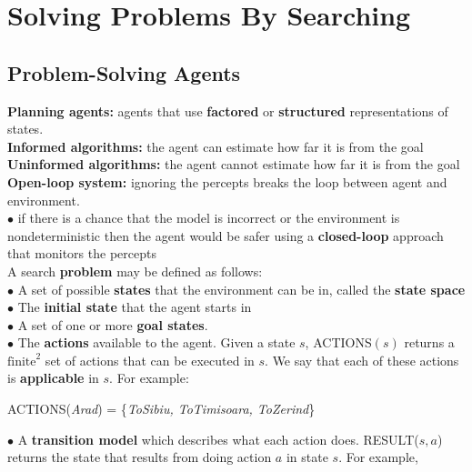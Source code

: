 \section{Solving Problems By Searching}

    \subsection{Problem-Solving Agents}                     %

        \textbf{Planning agents:} agents that use \textbf{factored} or \textbf{structured} representations of states. \\
        \textbf{Informed algorithms:} the agent can estimate how far it is from the goal \\
        \textbf{Uninformed algorithms:} the agent cannot estimate how far it is from the goal \\
        \textbf{Open-loop system:} ignoring the percepts breaks the loop between agent and environment. \\
        $\bullet$ if there is a chance that the model is incorrect or the environment is nondeterministic then the agent would be safer using a \textbf{closed-loop} approach that monitors the percepts \\

        A search \textbf{problem} may be defined as follows: \\
        \indent $\bullet$ A set of possible \textbf{states} that the environment can be in, called the \textbf{state space} \\
        \indent $\bullet$ The \textbf{initial state} that the agent starts in \\
        \indent $\bullet$ A set of one or more \textbf{goal states}. \\
        \indent $\bullet$ The \textbf{actions} available to the agent. Given a state $s$, ACTIONS$(s)$ returns a $\text{finite}^2$ set of actions that can be executed in $s$. We say that each of these actions is
        \textbf{applicable} in $s$. For example:

        \begin{center}
            ACTIONS(\textit{Arad}) = \{\textit{ToSibiu, ToTimisoara, ToZerind}\}
        \end{center}

        \indent $\bullet$ A \textbf{transition model} which describes what each action does. RESULT($s,a$) returns the state that results from doing action $a$ in state $s$. For example,

